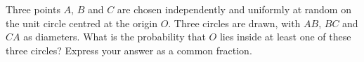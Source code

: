 Three points $A$, $B$ and $C$ are chosen independently and uniformly at random on the unit circle centred at the origin $O$. Three circles are drawn, with $AB$, $BC$ and $CA$ as diameters. What is the probability that $O$ lies inside at least one of these three circles? Express your answer as a common fraction.
